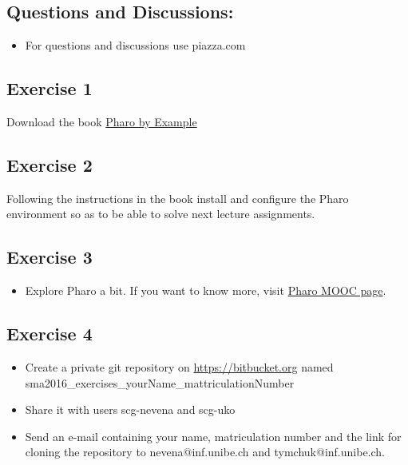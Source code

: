 \documentclass [11pt, a4wide, twoside]{article}
\begin{document}
\subsection*{Questions and Discussions:}

\begin{itemize}
  \item For questions and discussions use piazza.com
\end{itemize}

\subsection*{Exercise 1}

Download the book \href{https://ci.inria.fr/pharo-contribution/view/Books/job/UpdatedPharoByExample/lastSuccessfulBuild/artifact/book-result/UpdatedPharoByExample.pdf}{Pharo by Example}

\subsection*{Exercise 2}

Following the instructions in the book install and configure the Pharo environment so as to be able to solve next lecture assignments.

\subsection*{Exercise 3}

\begin{itemize}
\item Explore Pharo a bit. If you want to know more, visit \href{http://files.pharo.org/mooc/}{Pharo MOOC page}.
\end{itemize}

\subsection*{Exercise 4}

\begin{itemize}
  \item Create a private git repository on \href{https://bitbucket.org}{https://bitbucket.org} named sma2016\_exercises\_yourName\_mattriculationNumber
  \item Share it with users scg-nevena and scg-uko
\item Send an e-mail containing your name, matriculation number and the link for cloning the repository
to nevena@inf.unibe.ch and tymchuk@inf.unibe.ch.
\end{itemize}
\end{document}
